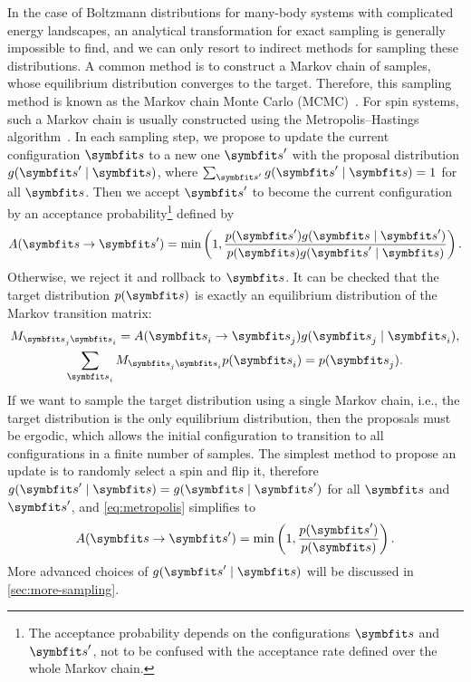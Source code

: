 In the case of Boltzmann distributions for many-body systems with complicated energy landscapes, an analytical transformation for exact sampling is generally impossible to find, and we can only resort to indirect methods for sampling these distributions. A common method is to construct a Markov chain of samples, whose equilibrium distribution converges to the target. Therefore, this sampling method is known as the Markov chain Monte Carlo (MCMC)~\cite{gelfand1990sampling, robert2020markov}. For spin systems, such a Markov chain is usually constructed using the Metropolis--Hastings algorithm~\cite{hastings1970monte}. In each sampling step, we propose to update the current configuration $\vs$ to a new one $\vs'$ with the proposal distribution $g(\vs' \mid \vs)$, where $\sum_{\vs'} g(\vs' \mid \vs) = 1$ for all $\vs$. Then we accept $\vs'$ to become the current configuration by an acceptance probability\footnote{The acceptance probability depends on the configurations $\vs$ and $\vs'$, not to be confused with the acceptance rate defined over the whole Markov chain.} defined by
\begin{equation}
A(\vs \to \vs') = \min\left( 1, \frac{p(\vs') g(\vs \mid \vs')}{p(\vs) g(\vs' \mid \vs)} \right).
\label{eq:metropolis}
\end{equation}
Otherwise, we reject it and rollback to $\vs$. It can be checked that the target distribution $p(\vs)$ is exactly an equilibrium distribution of the Markov transition matrix:
\begin{gather}
M_{\vs_j \vs_i} = A(\vs_i \to \vs_j) g(\vs_j \mid \vs_i), \label{eq:markov-matrix} \\
\sum_{\vs_i} M_{\vs_j \vs_i} p(\vs_i) = p(\vs_j).
\end{gather}
If we want to sample the target distribution using a single Markov chain, i.e., the target distribution is the only equilibrium distribution, then the proposals must be ergodic, which allows the initial configuration to transition to all configurations in a finite number of samples. The simplest method to propose an update is to randomly select a spin and flip it, therefore $g(\vs' \mid \vs) = g(\vs \mid \vs')$ for all $\vs$ and $\vs'$, and \cref{eq:metropolis} simplifies to
\begin{equation}
A(\vs \to \vs') = \min\left( 1, \frac{p(\vs')}{p(\vs)} \right).
\end{equation}
More advanced choices of $g(\vs' \mid \vs)$ will be discussed in \cref{sec:more-sampling}.

